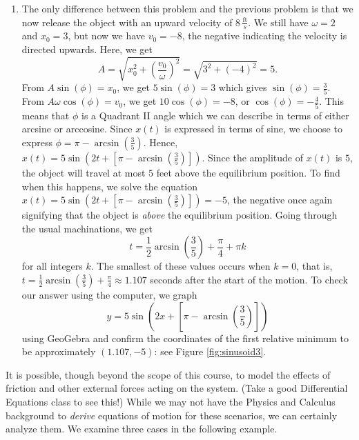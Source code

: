 {\begin{enumerate}

\item  The only difference between this problem and the previous problem is that we now release the object with an upward velocity of $8 \, \frac{\text{ft}}{s}$.  We still have $\omega = 2$ and $x_{0} = 3$, but now we have $v_{0} = -8$, the negative indicating the velocity is directed upwards. Here, we get 
\[
 A = \sqrt{x_{0}^2 + \left( \frac{v_{0}}{\omega}\right)^2} = \sqrt{3^2 + (-4)^2} = 5.
\]
From $A\sin(\phi) = x_{0}$, we get $5\sin(\phi) = 3$ which gives $\sin(\phi) = \frac{3}{5}$.  From  $A\omega\cos(\phi) = v_{0}$, we get $10\cos(\phi) = -8$, or $\cos(\phi) = -\frac{4}{5}$.  This means that $\phi$ is a Quadrant II angle which we can describe in terms of either arcsine or arccosine.  Since $x(t)$ is expressed in terms of sine, we choose to express $\phi = \pi - \arcsin\left(\frac{3}{5}\right)$.  Hence, $x(t)= 5 \sin\left(2t + \left[\pi - \arcsin\left(\frac{3}{5}\right)\right]\right)$.  Since the amplitude of $x(t)$ is $5$, the object will travel at most $5$ feet above the equilibrium position.  To find when this happens, we solve the equation $x(t)= 5 \sin\left(2t + \left[\pi - \arcsin\left(\frac{3}{5}\right)\right]\right)= -5$, the negative once again signifying that the object is \textit{above} the equilibrium position.  Going through the usual machinations, we get 
\[
 t = \frac{1}{2} \arcsin\left(\frac{3}{5}\right) +\frac{\pi}{4}  + \pi k
\]
for all integers $k$. The smallest of these values occurs when $k=0$, that is, $t = \frac{1}{2} \arcsin\left(\frac{3}{5}\right) +\frac{\pi}{4} \approx 1.107$ seconds after the start of the motion. To check our answer using the computer, we graph 
\[
 y = 5 \sin\left(2x + \left[\pi - \arcsin\left(\frac{3}{5}\right)\right]\right)
\]
using GeoGebra and confirm the coordinates of the first relative minimum to be approximately $(1.107,-5)$: see Figure \ref{fig:sinusoid3}.


\end{enumerate}
}

\medskip

It is possible, though beyond the scope of this course, to model the effects of friction and other external forces acting on the system. (Take a good Differential Equations class to see this!)  While we may not have the Physics and Calculus background to \textit{derive} equations of motion for these scenarios, we can certainly analyze them.  We examine three cases in the following example.

